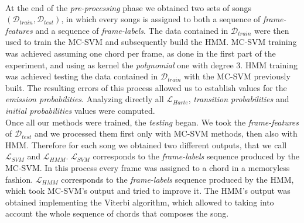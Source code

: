 \\
%
At the end of the \textit{pre-processing} phase we obtained two sets of songs $(\mathcal{D}_{train},\mathcal{D}_{test})$, in which every songs is assigned to both a sequence of \textit{frame-features} and a sequence of \textit{frame-labels}. The data contained in $\mathcal{D}_{train}$ were then used to train the MC-SVM and subsequently build the HMM. MC-SVM training was achieved assuming one chord per frame, as done in the first part of the experiment, and using as kernel the \textit{polynomial} one with degree 3. HMM training was achieved testing the data contained in $\mathcal{D}_{train}$ with the MC-SVM previously built. The resulting errors of this process allowed us to establish values for the \textit{emission probabilities}. Analyzing directly all $\mathcal{L}_{Harte}$, \textit{transition probabilities} and \textit{initial probabilities} values were computed. \\
%
Once all our methods were trained, the \textit{testing} began. We took the \textit{frame-features} of $\mathcal{D}_{test}$ and we processed them first only with MC-SVM methods, then also with HMM. Therefore for each song we obtained two different outputs, that we call $\mathcal{L}_{SVM}$ and $\mathcal{L}_{HMM}$. $\mathcal{L}_{SVM}$ corresponds to the \textit{frame-labels} sequence produced by the MC-SVM. In this process every frame was assigned to a chord in a memoryless fashion. $\mathcal{L}_{HMM}$ corresponds to the \textit{frame-labels} sequence produced by the HMM, which took MC-SVM's output and tried to improve it. The HMM's output was obtained implementing the Viterbi algorithm, which allowed to taking into account the whole sequence of chords that composes the song.
